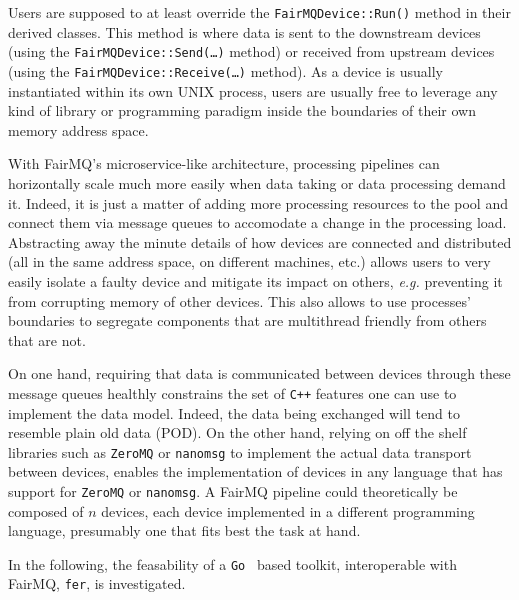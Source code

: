 \documentclass{webofc}
\begin{document}
Users are supposed to at least override the \texttt{FairMQDevice::Run()} method in their derived classes.
This method is where data is sent to the downstream devices (using the \texttt{FairMQDevice::Send(\ldots)} method) or received from upstream devices (using the \texttt{FairMQDevice::Receive(\ldots)} method).
As a device is usually instantiated within its own UNIX process, users are usually free to leverage any kind of library or programming paradigm inside the boundaries of their own memory address space.

With FairMQ's microservice-like architecture, processing pipelines can horizontally scale much more easily when data taking or data processing demand it.
Indeed, it is just a matter of adding more processing resources to the pool and connect them via message queues to accomodate a change in the processing load.
Abstracting away the minute details of how devices are connected and distributed (all in the same address space, on different machines, etc.) allows users to very easily isolate a faulty device and mitigate its impact on others, \emph{e.g.} preventing it from corrupting memory of other devices.
This also allows to use processes' boundaries to segregate components that are multithread friendly from others that are not.

On one hand, requiring that data is communicated between devices through these message queues healthly constrains the set of \texttt{C++} features one can use to implement the data model.
Indeed, the data being exchanged will tend to resemble plain old data (POD).
On the other hand, relying on off the shelf libraries such as \texttt{ZeroMQ} or \texttt{nanomsg} to implement the actual data transport between devices, enables the implementation of devices in any language that has support for \texttt{ZeroMQ} or \texttt{nanomsg}.
A FairMQ pipeline could theoretically be composed of $n$ devices, each device implemented in a different programming language, presumably one that fits best the task at hand.

In the following, the feasability of a \texttt{Go}~\cite{ref-golang} based toolkit, interoperable with FairMQ, \texttt{fer}, is investigated.
\end{document}
